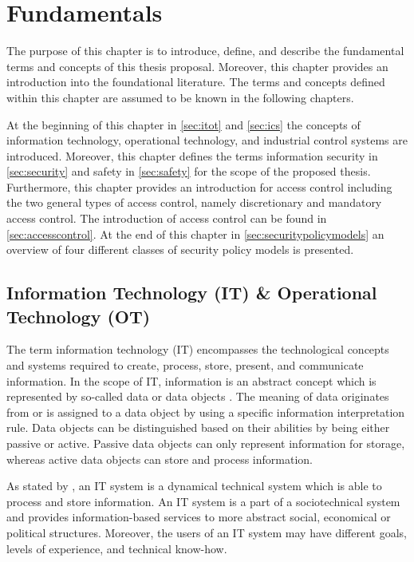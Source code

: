 \chapter{Fundamentals}
\label{ch:fundamentals}
The purpose of this chapter is to introduce, define, and describe the fundamental terms and concepts of this thesis proposal.
Moreover, this chapter provides an introduction into the foundational literature.
The terms and concepts defined within this chapter are assumed to be known in the following chapters. 

At the beginning of this chapter in \autoref{sec:itot} and \autoref{sec:ics} the concepts of information technology, operational technology, and industrial control systems are introduced.
Moreover, this chapter defines the terms information security in \autoref{sec:security} and safety in \autoref{sec:safety} for the scope of the proposed thesis.
Furthermore, this chapter provides an introduction for access control including the two general types of access control, namely discretionary and mandatory access control.
The introduction of access control can be found in \autoref{sec:accesscontrol}.
At the end of this chapter in \autoref{sec:securitypolicymodels} an overview of four different classes of security policy models is presented.

\section{Information Technology (IT) \& Operational Technology (OT)}
\label{sec:itot}
The term information technology (IT) encompasses the technological concepts and systems required to create, process, store, present, and communicate information.
In the scope of IT, information is an abstract concept which is represented by so-called data or data objects \cite{Eckert2023}.
The meaning of data originates from or is assigned to a data object by using a specific information interpretation rule.
Data objects can be distinguished based on their abilities by being either passive or active.
Passive data objects can only represent information for storage, whereas active data objects can store and process information.

As stated by \citeauthor{Eckert2023} \cite{Eckert2023}, an IT system is a dynamical technical system which is able to process and store information.
An IT system is a part of a sociotechnical system and provides information-based services to more abstract social, economical or political structures.
Moreover, the users of an IT system may have different goals, levels of experience, and technical know-how.

